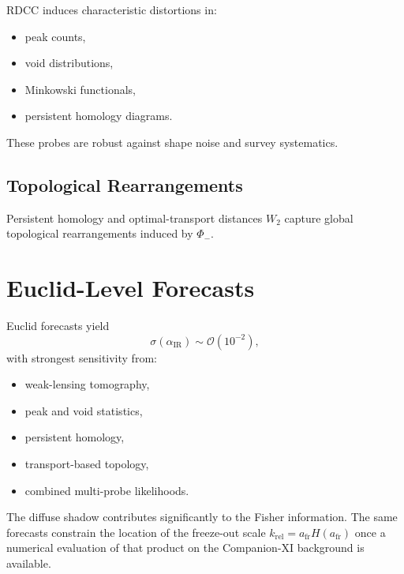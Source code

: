 \documentclass[11pt,a4paper]{article}
\begin{document}
RDCC induces characteristic distortions in:
\begin{itemize}
  \item peak counts,
  \item void distributions,
  \item Minkowski functionals,
  \item persistent homology diagrams.
\end{itemize}
These probes are robust against shape noise and survey systematics.

\subsection{Topological Rearrangements}

Persistent homology and optimal-transport distances \(W_{2}\) capture global
topological rearrangements induced by \(\Phi_{-}\).


\section{Euclid-Level Forecasts}

Euclid forecasts yield
\begin{equation}
  \sigma(\alpha_{\mathrm{IR}})
  \sim
  \mathcal{O}(10^{-2}),
\end{equation}
with strongest sensitivity from:
\begin{itemize}
  \item weak-lensing tomography,
  \item peak and void statistics,
  \item persistent homology,
  \item transport-based topology,
  \item combined multi-probe likelihoods.
\end{itemize}
The diffuse shadow contributes significantly to the Fisher information. The
same forecasts constrain the location of the freeze-out scale
\(k_{\mathrm{rel}}=a_{\mathrm{fr}}H(a_{\mathrm{fr}})\) once a numerical
evaluation of that product on the Companion-XI background is available.

\end{document}
